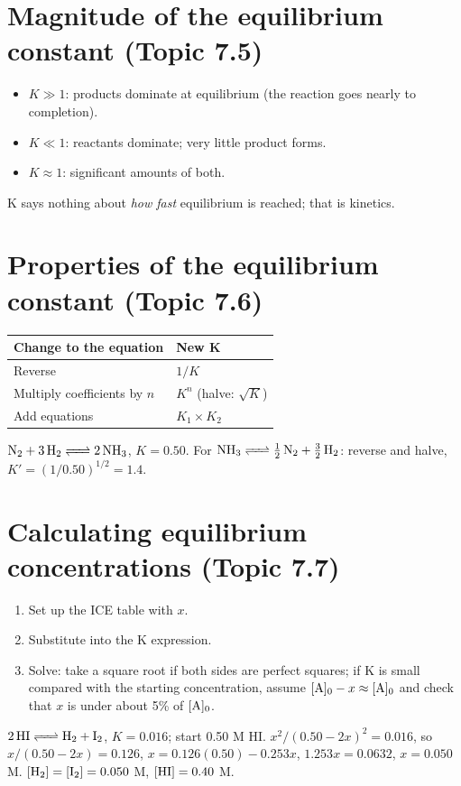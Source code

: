 \documentclass[11pt]{article}
\begin{document}
\section{Magnitude of the equilibrium constant (Topic 7.5)}\label{t:7.5}
\begin{itemize}
\item $K \gg 1$: products dominate at equilibrium (the reaction goes nearly to completion).
\item $K \ll 1$: reactants dominate; very little product forms.
\item $K \approx 1$: significant amounts of both.
\end{itemize}
K says nothing about \emph{how fast} equilibrium is reached; that is kinetics.

\section{Properties of the equilibrium constant (Topic 7.6)}\label{t:7.6}
\begin{center}
\begin{tabular}{ll}\toprule
Change to the equation & New K \\ \midrule
Reverse & $1/K$ \\
Multiply coefficients by $n$ & $K^n$ (halve: $\sqrt{K}$) \\
Add equations & $K_1 \times K_2$ \\ \bottomrule
\end{tabular}
\end{center}
 $\ce{N2 + 3H2 <=> 2NH3}$, $K = 0.50$. For $\ce{NH3 <=> 1/2N2 + 3/2H2}$: reverse and halve, $K' = (1/0.50)^{1/2} = 1.4$.

\section{Calculating equilibrium concentrations (Topic 7.7)}\label{t:7.7}
\begin{enumerate}
\item Set up the ICE table with $x$.
\item Substitute into the K expression.
\item Solve: take a square root if both sides are perfect squares; if K is small compared with the starting concentration, assume $[\ce{A}]_0 - x \approx [\ce{A}]_0$ and check that $x$ is under about 5\% of $[\ce{A}]_0$.
\end{enumerate}
 $\ce{2HI <=> H2 + I2}$, $K = 0.016$; start 0.50 M HI. $x^2/(0.50 - 2x)^2 = 0.016$, so $x/(0.50 - 2x) = 0.126$, $x = 0.126(0.50) - 0.253x$, $1.253x = 0.0632$, $x = 0.050$ M. $[\ce{H2}] = [\ce{I2}] = 0.050$ M, $[\ce{HI}] = 0.40$ M.
\end{document}
